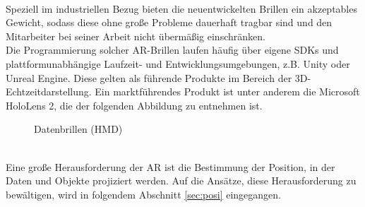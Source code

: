 \\ 
\linebreak %
Speziell im industriellen Bezug bieten die neuentwickelten Brillen ein akzeptables Gewicht, sodass diese ohne große 
Probleme dauerhaft tragbar sind und den Mitarbeiter bei seiner Arbeit nicht übermäßig einschränken.
\\ 
\linebreak
Die Programmierung solcher \acs{AR}-Brillen laufen häufig über eigene \acs{SDK}s und plattformunabhängige Laufzeit- und 
Entwicklungsumgebungen, z.B. Unity oder Unreal Engine. Diese gelten als führende Produkte im Bereich der 3D-Echtzeitdarstellung.
Ein marktführendes Produkt ist unter anderem die Microsoft HoloLens 2, die der folgenden Abbildung zu entnehmen ist. 
\begin{figure}[hbt!]
    \centering
    \caption{Datenbrillen (\acs{HMD})}
    \label{pic:datenbrillen}
\end{figure}
\\ 
\linebreak
Eine große Herausforderung der \acl{AR} ist die Bestimmung der Position, in der Daten und Objekte projiziert werden. Auf die 
Ansätze, diese Herausforderung zu bewältigen, wird in folgendem Abschnitt \ref{sec:posi} eingegangen.
